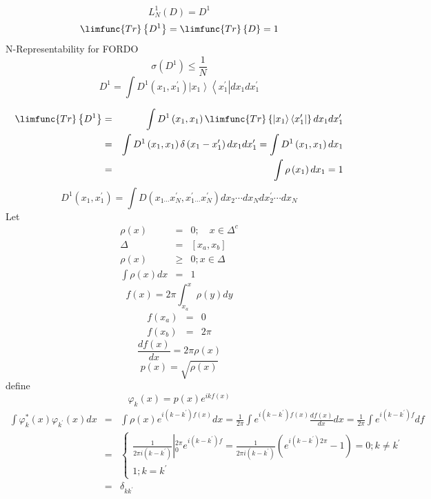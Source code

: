 \documentclass{article}
\begin{document}
\[
L_{N}^{1}(D)=D^{1}
\]%
\[
\limfunc{Tr}\left\{ D^{1}\right\} =\limfunc{Tr}\left\{ D\right\} =1
\]%
N-Representability for FORDO 
\[
\sigma \left( D^{1}\right) \leq \frac{1}{N}
\]%
\[
D^{1}=\int D^{1}\left( x_{1},x_{1}^{\prime }\right) \left\vert
x_{1}\right\rangle \left\langle x_{1}^{\prime }\right\vert
dx_{1}dx_{1}^{\prime }
\]

\begin{eqnarray*}
\limfunc{Tr}\left\{ D^{1}\right\}  &=&\int D^{1}\left( x_{1},x_{1}\right) 
\limfunc{Tr}\left\{ \left\vert x_{1}\right\rangle \left\langle x_{1}^{\prime
}\right\vert \right\} dx_{1}dx_{1}^{\prime } \\
&=&\int D^{1}\left( x_{1},x_{1}\right) \delta \left( x_{1}-x_{1}^{\prime
}\right) dx_{1}dx_{1}^{\prime }=\int D^{1}\left( x_{1},x_{1}\right) dx_{1} \\
&=&\int \rho \left( x_{1}\right) dx_{1}=1
\end{eqnarray*}%
\[
D^{1}\left( x_{1},x_{1}^{\prime }\right) =\int D\left( x_{1\cdots
}x_{N}^{\prime },x_{1}^{\prime }{}_{\cdots }x_{N}^{\prime }\right)
dx_{2}\cdots dx_{N}dx_{2}^{\prime }\cdots dx_{N}
\]%
Let 
\begin{eqnarray*}
\rho \left( x\right)  &=&0;\quad x\in \Delta ^{c} \\
\Delta  &=&\left[ x_{a},x_{b}\right]  \\
\rho \left( x\right)  &\geq &0;x\in \Delta  \\
\int \rho \left( x\right) dx &=&1
\end{eqnarray*}%
\[
f\left( x\right) =2\pi \int_{x_{a}}^{x}\rho \left( y\right) dy
\]%
\begin{eqnarray*}
f\left( x_{a}\right)  &=&0 \\
f\left( x_{b}\right)  &=&2\pi 
\end{eqnarray*}%
\[
\frac{df\left( x\right) }{dx}=2\pi \rho \left( x\right) 
\]%
\[
p\left( x\right) =\sqrt{\rho \left( x\right) }
\]%
define%
\[
\varphi _{k}\left( x\right) =p\left( x\right) e^{ikf\left( x\right) }
\]%
\begin{eqnarray*}
\int \varphi _{k}^{\ast }\left( x\right) \varphi _{k^{\prime }}\left(
x\right) dx &=&\int \rho \left( x\right) e^{i\left( k-k^{\prime }\right)
f\left( x\right) }dx=\frac{1}{2\pi }\int e^{i\left( k-k^{\prime }\right)
f\left( x\right) }\frac{df\left( x\right) }{dx}dx=\frac{1}{2\pi }\int
e^{i\left( k-k^{\prime }\right) f}df \\
&=&\left\{ 
\begin{array}{c}
\frac{1}{2\pi i\left( k-k^{\prime }\right) }\left\vert _{0}^{2\pi
}e^{i\left( k-k^{\prime }\right) f}\right. =\frac{1}{2\pi i\left(
k-k^{\prime }\right) }\left( e^{i\left( k-k^{\prime }\right) 2\pi }-1\right)
=0;k\neq k^{\prime } \\ 
1;k=k^{\prime }%
\end{array}%
\right.  \\
&=&\delta _{kk^{\prime }}
\end{eqnarray*}%
\end{document}
